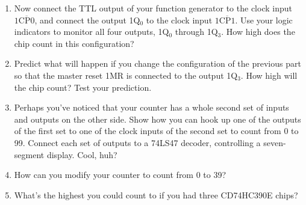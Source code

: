 \begin{enumerate}
\item Now connect the TTL output of your function generator to the clock input $1\mathrm{\overline{CP0}}$, and connect the output 1Q$_0$ to the clock input $1\mathrm{\overline{CP1}}$.  Use your logic indicators to monitor all four outputs, 1Q$_0$ through 1Q$_3$.  How high does the chip count in this configuration?  

\item Predict what will happen if you change the configuration of the previous part so that the master reset 1MR is connected to the output 1Q$_3$.  How high will the chip count?  Test your prediction.

\pagebreak[2]
\item Perhaps you've noticed that your counter has a whole second set of inputs and outputs on the other side.  Show how you can hook up one of the outputs of the first set to one of the clock inputs of the second set to count from 0 to 99.  Connect each set of outputs to a 74LS47 decoder, controlling a seven-segment display.  Cool, huh? \label{part_two_digit_counter_99}

\item How can you modify your counter to count from 0 to 39?  \label{part_two_digit_counter_39}

\item What's the highest you could count to if you had three CD74HC390E chips?


\end{enumerate}
